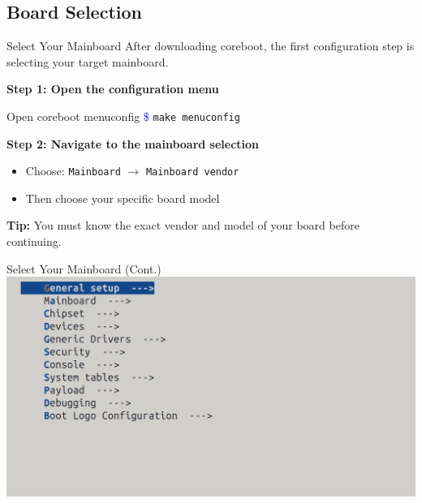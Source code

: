 \documentclass{beamer}
\begin{document}
	
	
	
	\subsection{Board Selection}
	\begin{frame}{Select Your Mainboard}
		After downloading coreboot, the first configuration step is selecting your target mainboard.
		
		\vspace{0.3cm}
		\textbf{Step 1: Open the configuration menu}
		\begin{exampleblock}{Open coreboot menuconfig}
			\textcolor{blue}{\$} \texttt{make menuconfig}
		\end{exampleblock}
		
		\textbf{Step 2: Navigate to the mainboard selection}
		
		\begin{itemize}
			\item Choose: \texttt{Mainboard} $\rightarrow$ \texttt{Mainboard vendor}
			\item Then choose your specific board model
		\end{itemize}
		
		\vspace{0.3cm}
		\textbf{Tip:} You must know the exact vendor and model of your board before continuing.
	\end{frame}
	
	
	
	
	
	\begin{frame}{Select Your Mainboard (Cont.)}
		\centering
		\includegraphics[width=1\linewidth]{images/img2}
	\end{frame}
	
	
	
\end{document}
